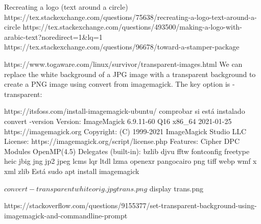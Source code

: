 Recreating a logo (text around a circle)
https://tex.stackexchange.com/questions/75638/recreating-a-logo-text-around-a-circle
https://tex.stackexchange.com/questions/493500/making-a-logo-with-arabic-text?noredirect=1&lq=1
https://tex.stackexchange.com/questions/96678/toward-a-stamper-package


https://www.togaware.com/linux/survivor/transparent-images.html
We can replace the white background of a JPG image with a transparent background to create a PNG image using convert from imagemagick. The key option is -transparent:


https://itsfoss.com/install-imagemagick-ubuntu/
comprobar si está instalado
convert -version
Version: ImageMagick 6.9.11-60 Q16 x86_64 2021-01-25 https://imagemagick.org
Copyright: (C) 1999-2021 ImageMagick Studio LLC
License: https://imagemagick.org/script/license.php
Features: Cipher DPC Modules OpenMP(4.5) 
Delegates (built-in): bzlib djvu fftw fontconfig freetype heic jbig jng jp2 jpeg lcms lqr ltdl lzma openexr pangocairo png tiff webp wmf x xml zlib
Está
sudo apt install imagemagick


$ convert -transparent white orig.jpg trans.png
$ display trans.png


https://stackoverflow.com/questions/9155377/set-transparent-background-using-imagemagick-and-commandline-prompt
















